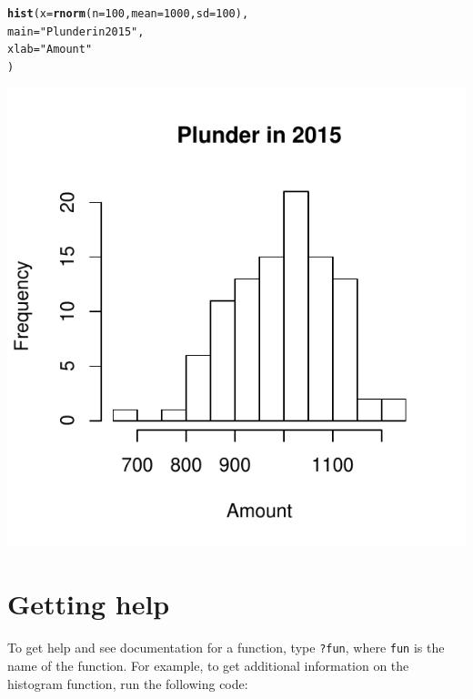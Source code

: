 \documentclass{tufte-book}\usepackage[]{graphicx}\usepackage[]{color}
\makeatletter
\def\maxwidth{ %
  \ifdim\Gin@nat@width>\linewidth
    \linewidth
  \else
    \Gin@nat@width
  \fi
}
\newcommand{\hlnum}[1]{\textcolor[rgb]{0.686,0.059,0.569}{#1}}%
\newcommand{\hlstr}[1]{\textcolor[rgb]{0.192,0.494,0.8}{#1}}%
\newcommand{\hlstd}[1]{\textcolor[rgb]{0.345,0.345,0.345}{#1}}%
\newcommand{\hlkwc}[1]{\textcolor[rgb]{0.333,0.667,0.333}{#1}}%
\newcommand{\hlkwd}[1]{\textcolor[rgb]{0.737,0.353,0.396}{\textbf{#1}}}%
\newenvironment{kframe}{%
 \def\at@end@of@kframe{}%
 \ifinner\ifhmode%
  \def\at@end@of@kframe{\end{minipage}}%
  \begin{minipage}{\columnwidth}%
 \fi\fi%
 \def\FrameCommand##1{\hskip\@totalleftmargin \hskip-\fboxsep
 \colorbox{shadecolor}{##1}\hskip-\fboxsep
     \hskip-\linewidth \hskip-\@totalleftmargin \hskip\columnwidth}%
 \MakeFramed {\advance\hsize-\width
   \@totalleftmargin\z@ \linewidth\hsize
   \@setminipage}}%
 {\par\unskip\endMakeFramed%
 \at@end@of@kframe}
\newenvironment{knitrout}{}{} %
\makeatother
\begin{document}
\begin{footnotesize}
\begin{knitrout}
\color{fgcolor}\begin{kframe}
\begin{alltt}
\hlkwd{hist}\hlstd{(}\hlkwc{x} \hlstd{=} \hlkwd{rnorm}\hlstd{(}\hlkwc{n} \hlstd{=} \hlnum{100}\hlstd{,} \hlkwc{mean} \hlstd{=} \hlnum{1000}\hlstd{,} \hlkwc{sd} \hlstd{=} \hlnum{100}\hlstd{),}
     \hlkwc{main} \hlstd{=} \hlstr{"Plunder in 2015"}\hlstd{,}
     \hlkwc{xlab} \hlstd{=} \hlstr{"Amount"}
     \hlstd{)}
\end{alltt}
\end{kframe}
\includegraphics[width=\maxwidth]{figure/unnamed-chunk-4-1} 

\end{knitrout}
\end{footnotesize}

\section{Getting help}

To get help and see documentation for a function, type \texttt{?fun}, where \texttt{fun} is the name of the function. For example, to get additional information on the histogram function, run the following code:
\end{document}
